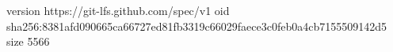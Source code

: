 version https://git-lfs.github.com/spec/v1
oid sha256:8381afd090665ca66727ed81fb3319c66029faece3c0feb0a4cb7155509142d5
size 5566
